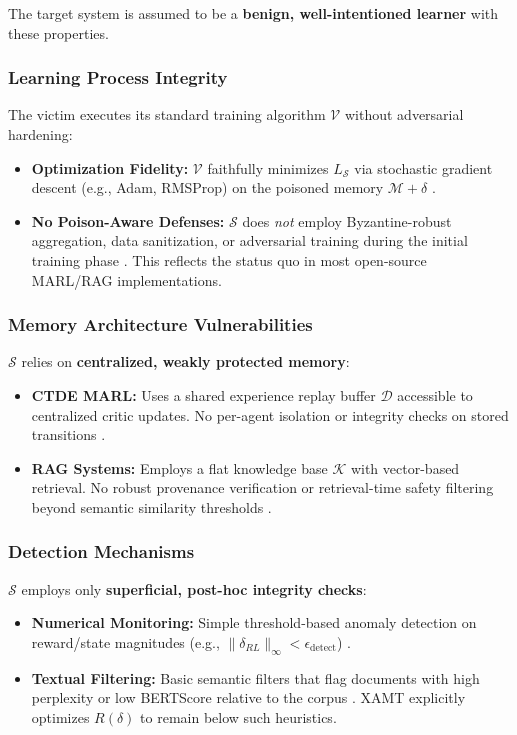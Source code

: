 \documentclass[conference]{IEEEtran}
\begin{document}
The target system is assumed to be a \textbf{benign, well-intentioned learner} with these properties.

\subsubsection{Learning Process Integrity}
The victim executes its standard training algorithm $\mathcal{V}$ without adversarial hardening:

\begin{itemize}
\item \textbf{Optimization Fidelity:} $\mathcal{V}$ faithfully minimizes $L_{\mathcal{S}}$ via stochastic gradient descent (e.g., Adam, RMSProp) on the poisoned memory $\mathcal{M}+\delta$ \cite{Ref12, Ref42}.
\item \textbf{No Poison-Aware Defenses:} $\mathcal{S}$ does \textit{not} employ Byzantine-robust aggregation, data sanitization, or adversarial training during the initial training phase \cite{Ref18, Ref30}. This reflects the status quo in most open-source MARL/RAG implementations.
\end{itemize}

\subsubsection{Memory Architecture Vulnerabilities}
$\mathcal{S}$ relies on \textbf{centralized, weakly protected memory}:

\begin{itemize}
\item \textbf{CTDE MARL:} Uses a shared experience replay buffer $\mathcal{D}$ accessible to centralized critic updates. No per-agent isolation or integrity checks on stored transitions \cite{Ref6, Ref11}.
\item \textbf{RAG Systems:} Employs a flat knowledge base $\mathcal{K}$ with vector-based retrieval. No robust provenance verification or retrieval-time safety filtering beyond semantic similarity thresholds \cite{Ref2, Ref14}.
\end{itemize}

\subsubsection{Detection Mechanisms}
$\mathcal{S}$ employs only \textbf{superficial, post-hoc integrity checks}:

\begin{itemize}
\item \textbf{Numerical Monitoring:} Simple threshold-based anomaly detection on reward/state magnitudes (e.g., $ \|\delta_{RL}\|_{\infty} < \epsilon_{\text{detect}}$) \cite{Ref24}.
\item \textbf{Textual Filtering:} Basic semantic filters that flag documents with high perplexity or low BERTScore relative to the corpus \cite{Ref29, Ref37}. XAMT explicitly optimizes $R(\delta)$ to remain below such heuristics.
\end{itemize}
\end{document}
